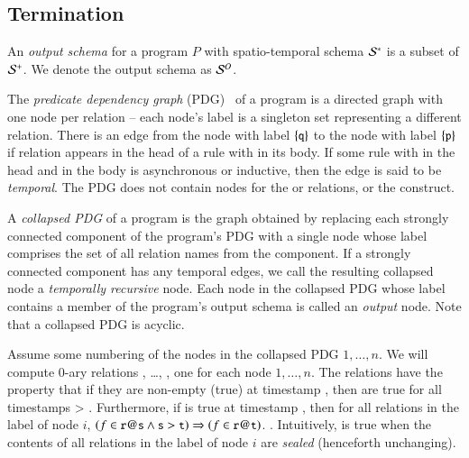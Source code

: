 \subsection{Termination}

An {\em output schema} for a \lang program $P$ with spatio-temporal schema $\stschema$ is a subset of $\sschema$.  We denote the output schema as $\oschema$.

The {\em predicate dependency graph} (PDG)~\cite{ullmanbook} of a \lang program is a directed graph with one node per relation -- each node's label is a singleton set representing a different relation.  There is an edge from the node with label $\{\dedalus{q}\}$ to the node with label $\{\dedalus{p}\}$ if relation  appears in the head of a rule with  in its body.  If some rule with  in the head and  in the body is asynchronous or inductive, then the edge is said to be {\em temporal}. 
The PDG does not contain nodes for the  or  relations, or the  construct.

A {\em collapsed PDG} of a \lang program is the graph obtained by replacing each strongly connected component of the program's PDG with a single node whose label comprises the set of all relation names from the component.
If a strongly connected component has any temporal edges, we call the resulting collapsed node a {\em temporally recursive} node.  Each node in the collapsed PDG whose label contains a member of the program's output schema is called an {\em output} node.  Note that a collapsed PDG is acyclic.


Assume some numbering of the nodes in the collapsed PDG $1,\ldots,n$.
We will compute 0-ary relations , \ldots, , one for each node $1,\ldots,n$.  The relations  have the property that if they are non-empty (true) at timestamp , then are true for all timestamps  > .  Furthermore, if  is true at timestamp , then for all relations  in the label of node $i$, $(f \in \dedalus{r}@\dedalus{s} \land \dedalus{s} > \dedalus{t}) \Rightarrow (f \in \dedalus{r}@\dedalus{t})$. .  Intuitively,  is true when the contents of all relations in the label of node $i$ are {\em sealed} (henceforth unchanging).

